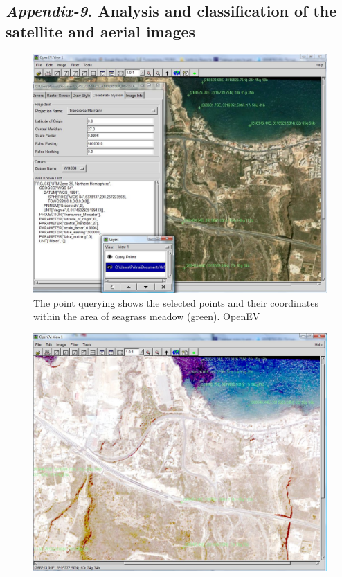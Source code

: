 \documentclass[11pt]{article}
\begin{document}
\begin{appendices}
\subsection{\textit{Appendix-9}. Analysis and classification of the satellite and aerial images}

\begin{figure}[H]
	\begin{center}
		\includegraphics[scale=0.23]{OpenEV-2.jpg}
		\caption{The point querying shows the selected points and their coordinates within the area of seagrass meadow (green). \href{http://openev.sourceforge.net/}{OpenEV}}\label{fig:A.39}	
	\end{center}	
\end{figure}
\begin{figure}[H]
	\begin{center}
		\includegraphics[scale=0.23]{OpenEV-3.jpg}

\end{center}
\end{figure}
\end{appendices}
\end{document}
